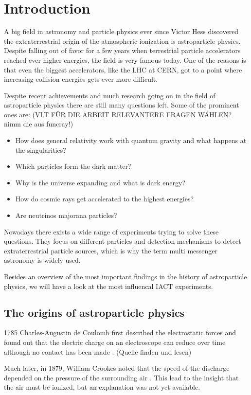 \chapter{Introduction}
A big field in astronomy and particle physics ever since Victor Hess discovered
the extraterrestrial origin of the atmospheric ionization
is astroparticle physics. Despite falling out of favor for a few years
when terrestrial particle accelerators reached ever higher energies,
the field is very famous today. One of the reasons is that
even the biggest accelerators, like the LHC at CERN, got to a point where
increasing collision energies gets ever more difficult.

Despite recent achievements and much research going on
in the field of astroparticle physics
there are still many questions left.
Some of the prominent ones are:
(VLT FÜR DIE ARBEIT RELEVANTERE FRAGEN WÄHLEN? nimm die aus funcray!)
\begin{itemize}
    \item{How does general relativity work with quantum gravity and 
	what happens at the singularities?}
    \item{Which particles form the dark matter?}
    \item{Why is the universe expanding and what is dark energy?}
    \item{How do cosmic rays get accelerated to the highest energies?}
    \item{Are neutrinos majorana particles?}
\end{itemize}

Nowadays there exists a wide range of experiments trying to
solve these questions. They focus on different particles and detection
mechanisms to detect
extraterrestrial particle sources, which is why
the term multi messenger astronomy is widely used.

Besides an overview of the most important findings in the history
of astroparticle physics, we will have a look at the 
most influencal IACT experiments.

\section{The origins of astroparticle physics}
1785 Charles-Augustin de Coulomb first described the electrostatic forces 
and found out that the electric charge on an electroscope can
reduce over time although no contact has been made \cite{coulomb1785premier}.
(Quelle finden und lesen)

Much later, in 1879, William Crookes noted that the speed of the discharge
depended on the pressure of the surrounding air 
\cite{doi:10.1098/rstl.1879.0076}.
This lead to the insight that the air must be ionized, but an 
explanation was not yet available.

